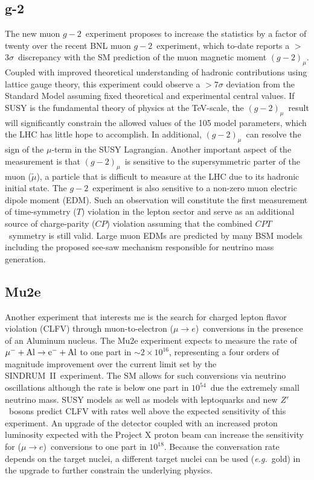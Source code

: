 \documentclass[12pt]{article}
\begin{document}
\subsection{g-2}
The new muon $g-2$~experiment proposes to increase the statistics by a factor of twenty over the recent BNL muon $g-2$~experiment, which to-date reports a $>$$3\sigma$~discrepancy with the SM prediction of the muon magnetic moment $(g-2)_{\mu}$. Coupled with improved theoretical understanding of hadronic contributions using lattice gauge theory, this experiment could observe a $>$$7\sigma$ deviation from the Standard Model assuming fixed theoretical and experimental central values. If SUSY is the fundamental theory of physics at the TeV-scale, the $(g-2)_\mu$~result will significantly constrain the allowed values of the 105 model parameters, which the LHC has little hope to accomplish. In additional, $(g-2)_\mu$~can resolve the sign of the $\mu$-term in the SUSY Lagrangian. Another important aspect of the measurement is that $(g-2)_\mu$~is sensitive to the supersymmetric parter of the muon ($\tilde{\mu}$), a particle that is difficult to measure at the LHC due to its hadronic initial state. The $g-2$~experiment is also sensitive to a non-zero muon electric dipole moment (EDM). Such an observation will constitute the first measurement of time-symmetry ($T$) violation in the lepton sector and serve as an additional source of charge-parity ($CP$) violation assuming that the combined $CPT$~symmetry is still valid. Large muon EDMs are predicted by many BSM models including the proposed see-saw mechanism responsible for neutrino mass generation.

\subsection{Mu2e}
Another experiment that interests me is the search for charged lepton flavor violation (CLFV) through muon-to-electron ($\mu\rightarrow e$)~conversions in the presence of an Aluminum nucleus. The Mu2e experiment expects to measure the rate of $\mu^{-}+\rm{Al}\rightarrow e^{-}+\rm{Al}$ to one part in $\sim2\times10^{16}$, representing a four orders of magnitude improvement over the current limit set by the \mbox{SINDRUM II}~experiment. The SM allows for such conversions via neutrino oscillations although the rate is below one part in $10^{54}$~due the extremely small neutrino mass. SUSY models as well as models with leptoquarks and new $Z'$~bosons predict CLFV with rates well above the expected sensitivity of this experiment. An upgrade of the detector coupled with an increased proton luminosity expected with the Project X  proton beam can increase the sensitivity for ($\mu\rightarrow e$)~conversions to one part in $10^{18}$. Because the conversation rate depends on the target nuclei, a different target nuclei can be used ({\it{e.g.}}~gold) in the upgrade to further constrain the underlying physics.
\end{document}
